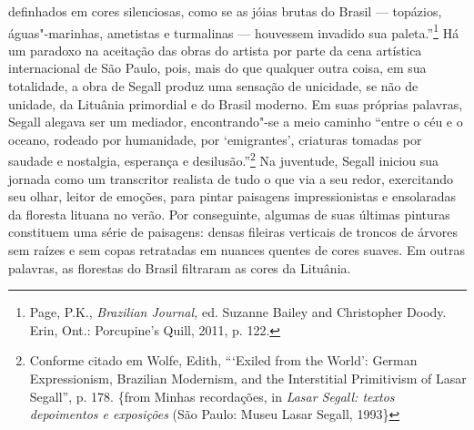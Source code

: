 definhados em cores silenciosas, como se as jóias brutas do Brasil ---
topázios, águas"-marinhas, ametistas e turmalinas --- houvessem invadido
sua paleta.''\footnote{Page, P.K., \emph{Brazilian Journal,} ed. Suzanne
  Bailey and Christopher Doody. Erin, Ont.: Porcupine's Quill, 2011, p.
  122.} Há um paradoxo na aceitação das obras do artista por parte da
cena artística internacional de São Paulo, pois, mais do que qualquer
outra coisa, em sua totalidade, a obra de Segall produz uma sensação de
unicidade, se não de unidade, da Lituânia primordial e do Brasil
moderno. Em suas próprias palavras, Segall alegava ser um mediador,
encontrando"-se a meio caminho ``entre o céu e o oceano, rodeado por
humanidade, por `emigrantes', criaturas tomadas por saudade e nostalgia,
esperança e desilusão.''\footnote{Conforme citado em Wolfe, Edith,
  ```Exiled from the World': German Expressionism, Brazilian Modernism,
  and the Interstitial Primitivism of Lasar Segall'', p. 178. \{from
  Minhas recordações, in \emph{Lasar Segall: textos depoimentos e
  exposições} (São Paulo: Museu Lasar Segall, 1993\}} Na juventude,
Segall iniciou sua jornada como um transcritor realista de tudo o que
via a seu redor, exercitando seu olhar, leitor de emoções, para pintar
paisagens impressionistas e ensolaradas da floresta lituana no verão.
Por conseguinte, algumas de suas últimas pinturas constituem uma série
de paisagens: densas fileiras verticais de troncos de árvores sem raízes
e sem copas retratadas em nuances quentes de cores suaves. Em outras
palavras, as florestas do Brasil filtraram as cores da Lituânia.

